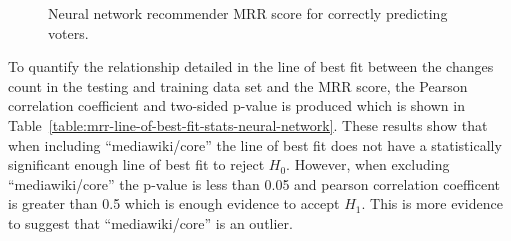 \begin{figure}[H]%
    \centering
    \caption{Neural network recommender MRR score for correctly predicting voters.}%
    \label{fig:neural-network-mrr-voted}%
\end{figure}

To quantify the relationship detailed in the line of best fit between the changes count in the testing and training data set and the MRR score, the Pearson correlation coefficient and two-sided p-value is produced which is shown in Table~\ref{table:mrr-line-of-best-fit-stats-neural-network}. These results show that when including ``mediawiki/core'' the line of best fit does not have a statistically significant enough line of best fit to reject \(H_0\). However, when excluding ``mediawiki/core'' the p-value is less than 0.05 and pearson correlation coefficent is greater than 0.5 which is enough evidence to accept \(H_1\). This is more evidence to suggest that ``mediawiki/core'' is an outlier.

